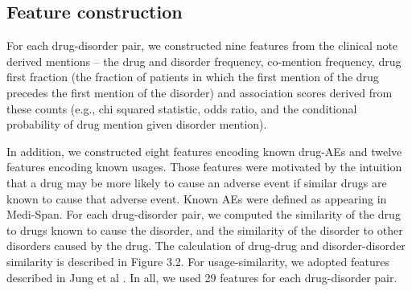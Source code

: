 \subsection{Feature construction}
For each drug-disorder pair, we constructed nine features from the
clinical note derived mentions – the drug and disorder frequency,
co-mention frequency, drug first fraction (the fraction of patients in
which the first mention of the drug precedes the first mention of the
disorder) and association scores derived from these counts (e.g., chi
squared statistic, odds ratio, and the conditional probability of drug
mention given disorder mention).

In addition, we constructed eight features encoding known drug-AEs and
twelve features encoding known usages. Those features were motivated
by the intuition that a drug may be more likely to cause an adverse
event if similar drugs are known to cause that adverse event. Known
AEs were defined as appearing in Medi-Span. For each drug-disorder
pair, we computed the similarity of the drug to drugs known to cause
the disorder, and the similarity of the disorder to other disorders
caused by the drug. The calculation of drug-drug and disorder-disorder
similarity is described in Figure 3.2. For usage-similarity, we
adopted features described in Jung et al \cite{Jung2014}. In all, we
used 29 features for each drug-disorder pair.

